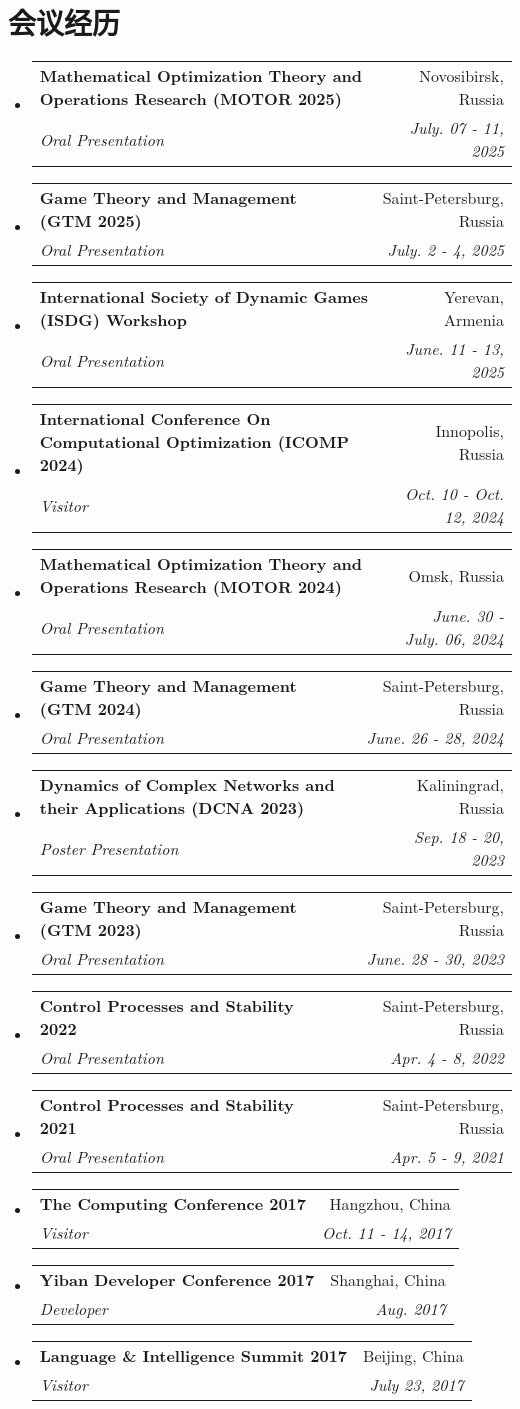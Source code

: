 \documentclass[letterpaper,10pt]{ctexart}
\makeatletter
\newcommand{\resumeSubheading}[4]{
  \vspace{-2pt}\item
  \begin{tabular*}{0.97\textwidth}[t]{l@{\extracolsep{\fill}}r}
    \textbf{#1} & #2 \\
    \textit{\small#3} & \textit{\small #4} \\
  \end{tabular*}\vspace{-7pt}
}
\newenvironment{resumeSubHeadingList}{\begin{itemize}[leftmargin=0.15in, label={}]}{\end{itemize}}
\makeatother
\begin{document}
\section{会议经历}
\begin{resumeSubHeadingList}
  \resumeSubheading{Mathematical Optimization Theory and Operations Research
                    (MOTOR 2025)}{Novosibirsk, Russia}{Oral Presentation}{July.
                    07 - 11, 2025}
  \resumeSubheading{Game Theory and Management (GTM 2025)}{Saint-Petersburg,
                    Russia}{Oral Presentation}{July. 2 - 4, 2025}
  \resumeSubheading{\nth{14} International Society of Dynamic Games (ISDG) Workshop}{Yerevan, Armenia}{Oral Presentation}{June. 11 - 13, 2025}
  \resumeSubheading{International Conference On Computational Optimization
                    (ICOMP 2024)}{Innopolis, Russia}{Visitor}{Oct. 10 - Oct.
                    12, 2024}
  \resumeSubheading{Mathematical Optimization Theory and Operations Research
                    (MOTOR 2024)}{Omsk, Russia}{Oral Presentation}{June. 30 -
                    July. 06, 2024}
  \resumeSubheading{Game Theory and Management (GTM 2024)}{Saint-Petersburg,
                    Russia}{Oral Presentation}{June. 26 - 28, 2024}
  \resumeSubheading{Dynamics of Complex Networks and their Applications (DCNA
                    2023)}{Kaliningrad, Russia}{Poster Presentation}{Sep. 18 -
                    20, 2023}
  \resumeSubheading{Game Theory and Management (GTM 2023)}{Saint-Petersburg,
                    Russia}{Oral Presentation}{June. 28 - 30, 2023}
  \resumeSubheading{Control Processes and Stability 2022}{Saint-Petersburg,
                    Russia}{Oral Presentation}{Apr. 4 - 8, 2022}
  \resumeSubheading{Control Processes and Stability 2021}{Saint-Petersburg,
                    Russia}{Oral Presentation}{Apr. 5 - 9, 2021}
  \resumeSubheading{The Computing Conference 2017}{Hangzhou,
                    China}{Visitor}{Oct. 11 - 14, 2017}
  \resumeSubheading{Yiban Developer Conference 2017}{Shanghai,
                    China}{Developer}{Aug. 2017}
  \resumeSubheading{Language \& Intelligence Summit 2017}{Beijing,
                    China}{Visitor}{July 23, 2017}
\end{resumeSubHeadingList}
\end{document}
